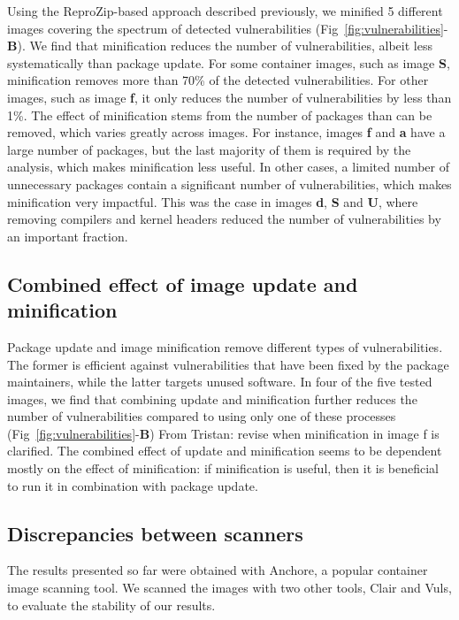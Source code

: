 \documentclass[a4paper,num-refs]{oup-contemporary}
\newcommand{\tristan}[1]{\color{blue}From Tristan: #1\color{black}}
\begin{document}
Using the ReproZip-based approach described previously, we minified 5
different images covering the spectrum of detected vulnerabilities
(Fig~\ref{fig:vulnerabilities}-\textbf{B}). We find that minification reduces the
number of vulnerabilities, albeit less systematically than package update.
For some container images, such as image \textbf{S}, minification removes more
than 70\% of the detected vulnerabilities. For other images, such as
image \textbf{f}, it only reduces the number of vulnerabilities by less than 1\%.
The effect of minification stems from the number of packages
than can be removed, which varies greatly across images. For
instance, images \textbf{f} and \textbf{a} have a large number of packages,
but the last majority of them is required by the analysis, which makes
minification less useful. In other cases, a limited number of unnecessary packages contain 
a significant number of vulnerabilities, which makes minification very impactful. 
This was the case in images \textbf{d}, \textbf{S} and \textbf{U}, where removing compilers
and kernel headers reduced the number of vulnerabilities by an important fraction. 

\subsection{Combined effect of image update and  minification}

Package update and image minification remove different types of
vulnerabilities. The former is efficient against vulnerabilities that have
been fixed by the package maintainers, while the latter targets unused
software. In four of the five tested images, we find that combining update
and minification further reduces the number of vulnerabilities compared to
using only one of these processes
(Fig~\ref{fig:vulnerabilities}-\textbf{B}) \tristan{revise when
minification in image f is clarified}. The combined effect of update and
minification seems to be dependent mostly on the effect of minification: if
minification is useful, then it is beneficial to run it in combination with
package update.

\subsection{Discrepancies between scanners}

The results presented so far were obtained with Anchore, a popular
container image scanning tool. We scanned the images with two other tools,
Clair and Vuls, to evaluate the stability of our results. 
\end{document}
